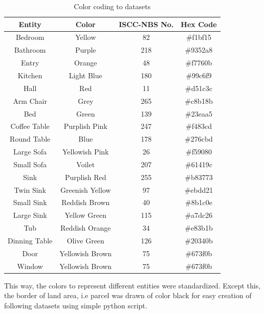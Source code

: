             \begin{table}[]
                \caption{Color coding to datasets}
                \label{tab:colorcode}
                \begin{tabular}{|c|c|c|c|}
                    \hline
                    \textbf{Entity} & \textbf{Color} & \textbf{ISCC-NBS No.} & \textbf{Hex Code}\\
                    \hline
                    Bedroom & Yellow & 82 & \#f1bf15\\
                    \hline
                    Bathroom & Purple & 218 & \#9352a8\\
                    \hline
                    Entry & Orange & 48 & \#f7760b\\
                    \hline
                    Kitchen & Light Blue & 180 & \#99c6f9\\
                    \hline
                    Hall & Red & 11 & \#d51c3c\\
                    \hline
                    Arm Chair & Grey & 265 & \#c8b18b\\
                    \hline
                    Bed & Green & 139 & \#23eaa5\\
                    \hline
                    Coffee Table & Purplish Pink & 247 & \#f483cd\\
                    \hline
                    Round Table & Blue & 178 & \#276cbd\\
                    \hline
                    Large Sofa & Yellowish Pink & 26 & \#f59080\\
                    \hline
                    Small Sofa & Voilet & 207 & \#61419c\\
                    \hline
                    Sink & Purplish Red & 255 & \#b83773\\
                    \hline
                    Twin Sink & Greenish Yellow & 97 & \#ebdd21\\
                    \hline
                    Small Sink & Reddish Brown & 40 & \#8b1c0e\\
                    \hline
                    Large Sink & Yellow Green & 115 & \#a7dc26\\
                    \hline
                    Tub & Reddish Orange & 34 & \#e83b1b\\
                    \hline
                    Dinning Table & Olive Green & 126 & \#20340b\\
                    \hline
                    Door & Yellowish Brown & 75 & \#673f0b\\
                    \hline
                    Window & Yellowish Brown & 75 & \#673f0b\\
                    \hline
                \end{tabular}
            \end{table}
            \break
            This way, the colors to represent different entities were standardized. Except this, the border of land area, i.e parcel was drawn of color black for easy creation of following datasets using simple python script.
